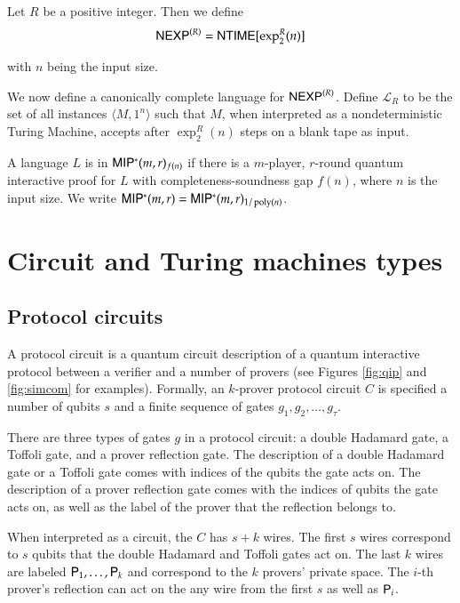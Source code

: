 \begin{definition}
	Let $R$ be a positive integer. Then we define
	\[
		{\sf NEXP}^{(R)} = {\sf NTIME}[\exp^R_2(n)]
	\]
\end{definition}
with $n$ being the input size. 

We now define a canonically complete language for ${\sf NEXP}^{(R)}$. Define $\mathcal{L}_R$ to be the set of all instances $\langle M, 1^n \rangle$ such that $M$, when interpreted as a nondeterministic Turing Machine, accepts after $\exp^R_2(n)$ steps on a blank tape as input.

\begin{definition}[$\MIPstar$]
	A language $L$ is in ${\sf MIP^*}(m,r)_{f(n)}$ if there is a $m$-player, $r$-round quantum interactive proof for $L$ with completeness-soundness gap $f(n)$, where $n$ is the input size. We write ${\sf MIP^*}(m,r) = {\sf MIP^*}(m,r)_{1/\operatorname{poly}(n)}$.
\end{definition}


\section{Circuit and Turing machines types}

\subsection{Protocol circuits} 
A protocol circuit is a quantum circuit description of a quantum interactive protocol between a verifier and a number of provers (see Figures \ref{fig:qip} and \ref{fig:simcom} for examples). Formally, an $k$-prover protocol circuit $C$ is specified a number of qubits $s$ and a finite sequence of gates $g_1,g_2,\ldots,g_\tau$. 

There are three types of gates $g$ in a protocol circuit: a double Hadamard gate, a Toffoli gate, and a prover reflection gate. The description of a double Hadamard gate or a Toffoli gate comes with indices of the qubits the gate acts on. The description of a prover reflection gate comes with the indices of qubits the gate acts on, as well as the label of the prover that the reflection belongs to.

When interpreted as a circuit, the $C$ has $s + k$ wires. The first $s$ wires correspond to $s$ qubits that the double Hadamard and Toffoli gates act on. The last $k$ wires are labeled ${\mathsf{P}}_1,\ldots,{\mathsf{P}}_k$ and correspond to the $k$ provers' private space. The $i$-th prover's reflection can act on the any wire from the first $s$ as well as ${\mathsf{P}}_i$.

